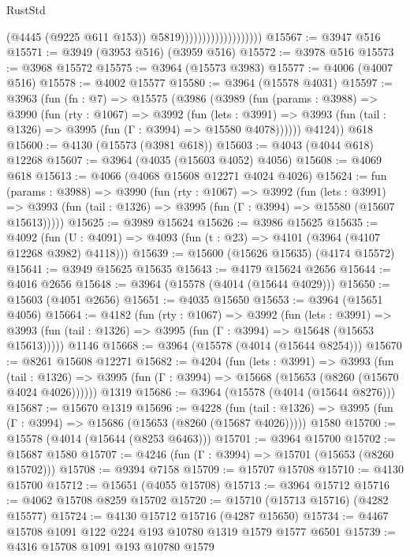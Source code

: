 \begin{lexlean}{RustStd}
\begin{coremodule}
{\begin{coremodule}
{{{{{{{{{{{{{{{{{{{{{{{{{{{{{{{{{{{{{{                                          (@4445 (@9225 @611 @153))
                                          @5819)))))))))))))))))))
@15567 := @3947 @516
@15571 := @3949 (@3953 @516) (@3959 @516)
@15572 := @3978 @516
@15573 := @3968 @15572
@15575 := @3964 (@15573 @3983)
@15577 := @4006 (@4007 @516)
@15578 := @4002 @15577
@15580 := @3964 (@15578 @4031)
@15597 := @3963
    (fun (fn : @7) =>
    @15575
      (@3986
        (@3989
          (fun (params : @3988) =>
          @3990
            (fun (rty : @1067) =>
            @3992
              (fun (lets : @3991) =>
              @3993 (fun (tail : @1326) => @3995 (fun (Γ : @3994) => @15580 @4078))))))
        @4124))
    @618
@15600 := @4130 (@15573 (@3981 @618))
@15603 := @4043 (@4044 @618) @12268
@15607 := @3964 (@4035 (@15603 @4052) @4056)
@15608 := @4069 @618
@15613 := @4066 (@4068 @15608 @12271 @4024 @4026)
@15624 := fun (params : @3988) =>
  @3990
    (fun (rty : @1067) =>
    @3992
      (fun (lets : @3991) =>
      @3993 (fun (tail : @1326) => @3995 (fun (Γ : @3994) => @15580 (@15607 @15613)))))
@15625 := @3989 @15624
@15626 := @3986 @15625
@15635 := @4092
    (fun (U : @4091) => @4093 (fun (t : @23) => @4101 (@3964 (@4107 @12268 @3982) @4118)))
@15639 := @15600 (@15626 @15635) (@4174 @15572)
@15641 := @3949 @15625 @15635
@15643 := @4179 @15624 @2656
@15644 := @4016 @2656
@15648 := @3964 (@15578 (@4014 (@15644 @4029)))
@15650 := @15603 (@4051 @2656)
@15651 := @4035 @15650
@15653 := @3964 (@15651 @4056)
@15664 := @4182
    (fun (rty : @1067) =>
    @3992
      (fun (lets : @3991) =>
      @3993 (fun (tail : @1326) => @3995 (fun (Γ : @3994) => @15648 (@15653 @15613)))))
    @1146
@15668 := @3964 (@15578 (@4014 (@15644 @8254)))
@15670 := @8261 @15608 @12271
@15682 := @4204
    (fun (lets : @3991) =>
    @3993
      (fun (tail : @1326) =>
      @3995 (fun (Γ : @3994) => @15668 (@15653 (@8260 (@15670 @4024 @4026))))))
    @1319
@15686 := @3964 (@15578 (@4014 (@15644 @8276)))
@15687 := @15670 @1319
@15696 := @4228
    (fun (tail : @1326) => @3995 (fun (Γ : @3994) => @15686 (@15653 (@8260 (@15687 @4026)))))
    @1580
@15700 := @15578 (@4014 (@15644 (@8253 @6463)))
@15701 := @3964 @15700
@15702 := @15687 @1580
@15707 := @4246 (fun (Γ : @3994) => @15701 (@15653 (@8260 @15702)))
@15708 := @9394 @7158
@15709 := @15707 @15708
@15710 := @4130 @15700
@15712 := @15651 (@4055 @15708)
@15713 := @3964 @15712
@15716 := @4062 @15708 @8259 @15702
@15720 := @15710 (@15713 @15716) (@4282 @15577)
@15724 := @4130 @15712 @15716 (@4287 @15650)
@15734 := @4467 @15708 @1091 @122 @224 @193 @10780 @1319 @1579 @1577 @6501
@15739 := @4316 @15708 @1091 @193 @10780 @1579
}}}}}}}}}}}}}}}}}}}}}}}}}}}}}}}}}}}}}}
\end{coremodule}}
\end{coremodule}
\end{lexlean}
